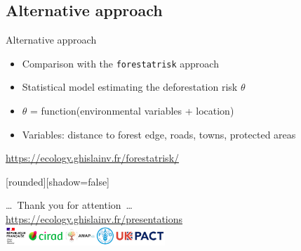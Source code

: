 \documentclass[10pt,table,dvipsnames,compress]{beamer}
\begin{document}
\subsection{Alternative approach}
\label{sec:org1227862}

\begin{frame}[label={sec:org27500ae},fragile]{Alternative approach}
 \begin{itemize}
\item Comparison with the \texttt{forestatrisk} approach
\item Statistical model estimating the deforestation risk \(\theta\)
\item \(\theta\) = function(environmental variables + location)
\item Variables: distance to forest edge, roads, towns, protected areas
\end{itemize}

\vspace{0.5cm}
\begin{center}
\url{https://ecology.ghislainv.fr/forestatrisk/}
\end{center}
\end{frame}


{
  [rounded][shadow=false]
  \begin{frame}[plain]
    \begin{block}{}
      \begin{center}
        \ldots~Thank you for attention~\ldots \\
        \url{https://ecology.ghislainv.fr/presentations} \\
        \includegraphics[width=0.45\textwidth]{figs/partners_logos}
      \end{center}
    \end{block}
  \end{frame}
}
\end{document}
